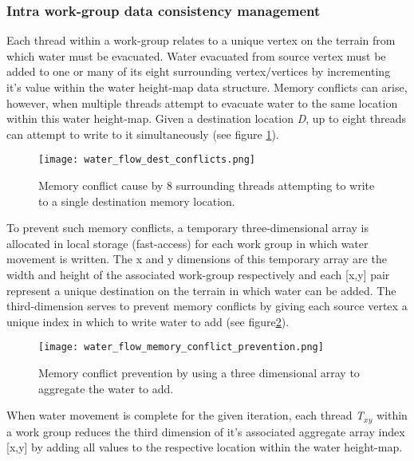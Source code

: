 \subsubsection{Intra work-group data consistency management}

Each thread within a work-group relates to a unique vertex on the terrain from which water must be evacuated. Water evacuated from source vertex must be added to one or many of its eight surrounding vertex/vertices by incrementing it's value within the water height-map data structure. Memory conflicts can arise, however, when multiple threads attempt to evacuate water to the same location within this water height-map. Given a destination location \textit{D}, up to eight threads can attempt to write to it simultaneously (see figure \ref{fig:water_flow_dest_conflicts}).\\ 

\begin{figure}
\center
	\texttt{[image: water\_flow\_dest\_conflicts.png]}
	\caption{ Memory conflict cause by 8 surrounding threads attempting to write to a single destination memory location. }
	\label{fig:water_flow_dest_conflicts}
\end{figure}

To prevent such memory conflicts, a temporary three-dimensional array is allocated in local storage (fast-access) for each work group in which water movement is written. The x and y dimensions of this temporary array are the width and height of the associated work-group respectively and each [x,y] pair represent a unique destination on the terrain in which water can be added. The third-dimension serves to prevent memory conflicts by giving each source vertex a unique index in which to write water to add (see figure\ref{fig:water_flow_dest_conflict_prevent}).\\

\begin{figure}
\center
	\texttt{[image: water\_flow\_memory\_conflict\_prevention.png]}
	\caption{ Memory conflict prevention by using a three dimensional array to aggregate the water to add. }
	\label{fig:water_flow_dest_conflict_prevent}
\end{figure}

When water movement is complete for the given iteration, each thread \textit{T$_{xy}$} within a work group reduces the third dimension of it's associated aggregate array index [x,y] by adding all values to the respective location within the water height-map.

